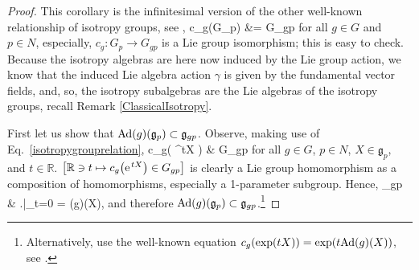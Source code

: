\begin{proof}
\leavevmode\newline
This corollary is the infinitesimal version of the other well-known relationship of isotropy groups, see \cite[abstract before Proposition 3.2.10; page 134]{hamilton},
\ba\label{isotropygrouprelation}
c_{g}(G_p)
&=
G_{gp}
\ea
for all $g \in G$ and $p \in N$, especially, $c_g: G_p \to G_{gp}$ is a Lie group isomorphism; this is easy to check. Because the isotropy algebras are here now induced by the Lie group action, we know that the induced Lie algebra action $\gamma$ is given by the fundamental vector fields, and, so, the isotropy subalgebras are the Lie algebras of the isotropy groups, recall Remark \ref{ClassicalIsotropy}.

First let us show that $\mathrm{Ad}\mleft(g\mright)(\mathfrak{g}_p) \subset \mathfrak{g}_{gp}$. Observe, making use of Eq.~\eqref{isotropygrouprelation},
\bas
c_g\mleft(
	\e^{tX}
\mright)
&\in
G_{gp}
\eas
for all $g \in G$, $p\in N$, $X \in \mathfrak{g}_p$, and $t \in \mathbb{R}$. $\mleft[ \mathbb{R} \ni t \mapsto c_g\mleft( 	\e^{tX} \mright) \in G_{gp} \mright]$ is clearly a Lie group homomorphism as a composition of homomorphisms, especially a 1-parameter subgroup. Hence,
\bas
{}_{gp}
&\ni
\mleft.\mright|_{t=0}
=
(g)(X),
\eas
and therefore $\mathrm{Ad}\mleft(g\mright)(\mathfrak{g}_p) \subset \mathfrak{g}_{gp}$.\footnote{Alternatively, use the well-known equation $c_g\mleft(\exp(tX) \mright) = \exp(t \mathrm{Ad}(g)(X))$, see \cite[Theorem 1.7.16; page 59]{hamilton}.}


\end{proof}

